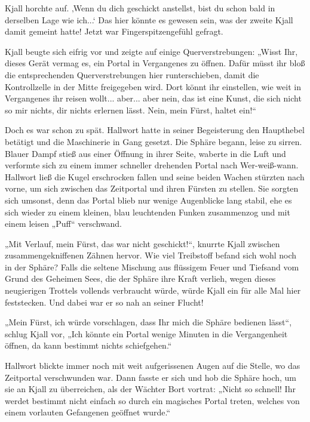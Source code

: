 \documentclass[10pt, a4paper, oneside]{book}
\begin{document}
Kjall horchte auf. ‚Wenn du dich geschickt anstellst, bist du schon bald in derselben Lage wie ich...‘ Das hier könnte es gewesen sein, was der zweite Kjall damit gemeint hatte! Jetzt war Fingerspitzengefühl gefragt.

Kjall beugte sich eifrig vor und zeigte auf einige Querverstrebungen: „Wisst Ihr, dieses Gerät vermag es, ein Portal in Vergangenes zu öffnen. Dafür müsst ihr bloß die entsprechenden Querverstrebungen hier runterschieben, damit die Kontrollzelle in der Mitte freigegeben wird. Dort könnt ihr einstellen, wie weit in Vergangenes ihr reisen wollt... aber... aber nein, das ist eine Kunst, die sich nicht so mir nichts, dir nichts erlernen lässt. Nein, mein Fürst, haltet ein!“

Doch es war schon zu spät. Hallwort hatte in seiner Begeisterung den Haupthebel betätigt und die Maschinerie in Gang gesetzt. Die Sphäre begann, leise zu sirren. Blauer Dampf stieß aus einer Öffnung in ihrer Seite, waberte in die Luft und verformte sich zu einem immer schneller drehenden Portal nach Wer-weiß-wann. Hallwort ließ die Kugel erschrocken fallen und seine beiden Wachen stürzten nach vorne, um sich zwischen das Zeitportal und ihren Fürsten zu stellen. Sie sorgten sich umsonst, denn das Portal blieb nur wenige Augenblicke lang stabil, ehe es sich wieder zu einem kleinen, blau leuchtenden Funken zusammenzog und mit einem leisen „Puff“ verschwand.

„Mit Verlauf, mein Fürst, das war nicht geschickt!“, knurrte Kjall zwischen zusammengekniffenen Zähnen hervor. Wie viel Treibstoff befand sich wohl noch in der Sphäre? Falls die seltene Mischung aus flüssigem Feuer und Tiefsand vom Grund des Geheimen Sees, die der Sphäre ihre Kraft verlieh, wegen dieses neugierigen Trottels vollends verbraucht würde, würde Kjall ein für alle Mal hier feststecken. Und dabei war er so nah an seiner Flucht!

„Mein Fürst, ich würde vorschlagen, dass Ihr mich die Sphäre bedienen lässt“, schlug Kjall vor, „Ich könnte ein Portal wenige Minuten in die Vergangenheit öffnen, da kann bestimmt nichts schiefgehen.“

Hallwort blickte immer noch mit weit aufgerissenen Augen auf die Stelle, wo das Zeitportal verschwunden war. Dann fasste er sich und hob die Sphäre hoch, um sie an Kjall zu überreichen, als der Wächter Bort vortrat: „Nicht so schnell! Ihr werdet bestimmt nicht einfach so durch ein magisches Portal treten, welches von einem vorlauten Gefangenen geöffnet wurde.“
\end{document}
